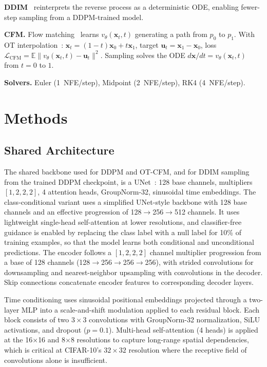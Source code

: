 \documentclass[10pt]{article}
\begin{document}
\textbf{DDIM}~\cite{song2021denoising} reinterprets the reverse process as a deterministic ODE, enabling fewer-step sampling from a DDPM-trained model.

\textbf{CFM.}
Flow matching~\cite{lipman2023flow} learns $v_\theta(\mathbf{x}_t, t)$ generating a path from $p_0$ to $p_1$.
With OT interpolation~\cite{tong2024improving}: $\mathbf{x}_t = (1{-}t)\mathbf{x}_0 + t\mathbf{x}_1$, target $\mathbf{u}_t = \mathbf{x}_1 - \mathbf{x}_0$, loss $\mathcal{L}_{\text{CFM}} = \mathbb{E}\|v_\theta(\mathbf{x}_t, t) - \mathbf{u}_t\|^2$.
Sampling solves the ODE $d\mathbf{x}/dt = v_\theta(\mathbf{x}_t, t)$ from $t{=}0$ to $1$.

\textbf{Solvers.}
Euler (1~NFE/step), Midpoint (2~NFE/step), RK4 (4~NFE/step).

  \section{Methods}

  \subsection{Shared Architecture}

    The shared backbone used for DDPM and OT-CFM, and for DDIM sampling from the trained DDPM checkpoint, is a UNet~\cite{ronneberger2015unet}: 128 base channels, multipliers $[1,2,2,2]$, 4 attention   
    heads, GroupNorm-32, sinusoidal time embeddings.                                                                                                                                                      
    The class-conditional variant uses a simplified UNet-style backbone with 128 base channels and an effective progression of 128$\rightarrow$256$\rightarrow$512 channels. It uses lightweight          
    single-head self-attention at lower resolutions, and classifier-free guidance is enabled by replacing the class label with a null label for 10\% of training examples, so that the model learns both  
    conditional and unconditional predictions. The encoder follows
   a $[1, 2, 2, 2]$ channel multiplier progression from a base of 128 channels (128$\rightarrow$256$\rightarrow$256$\rightarrow$256), with strided convolutions for downsampling and nearest-neighbor
  upsampling with convolutions in the decoder. Skip connections concatenate encoder features to corresponding decoder layers.

  Time conditioning uses sinusoidal positional embeddings projected through a two-layer MLP into a scale-and-shift modulation applied to each residual block. Each block consists of two $3{\times}3$
  convolutions with GroupNorm-32 normalization, SiLU activations, and dropout ($p{=}0.1$). Multi-head self-attention (4 heads) is applied at the 16$\times$16 and 8$\times$8 resolutions to capture
  long-range spatial dependencies, which is critical at CIFAR-10's $32{\times}32$ resolution where the receptive field of convolutions alone is insufficient.
\end{document}
